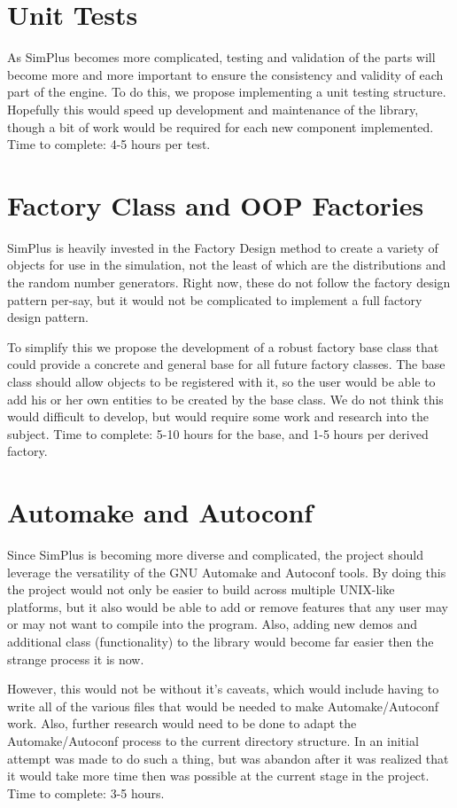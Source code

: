 \documentclass[12pt]{report}
\begin{document}
\section{Unit Tests}
	As SimPlus becomes more complicated, testing and validation of the parts will become more and more important to ensure the consistency and validity of each part of the engine.  To do this, we propose implementing a unit testing structure.  Hopefully this would speed up development and maintenance of the library, though a bit of work would be required for each new component implemented.  Time to complete: 4-5 hours per test.

\section{Factory Class and OOP Factories}
	SimPlus is heavily invested in the Factory Design method to create a variety of objects for use in the simulation, not the least of which are the distributions and the random number generators.  Right now, these do not follow the factory design pattern per-say, but it would not be complicated to implement a full factory design pattern.

	To simplify this we propose the development of a robust factory base class that could provide a concrete and general base for all future factory classes.  The base class should allow objects to be registered with it, so the user would be able to add his or her own entities to be created by the base class.  We do not think this would difficult to develop, but would require some work and research into the subject.  Time to complete: 5-10 hours for the base, and 1-5 hours per derived factory.

\section{Automake and Autoconf}
	Since SimPlus is becoming more diverse and complicated, the project should leverage the versatility of the GNU Automake and Autoconf tools.  By doing this the project would not only be easier to build across multiple UNIX-like platforms, but it also would be able to add or remove features that any user may or may not want to compile into the program.  Also, adding new demos and additional class (functionality) to the library would become far easier then the strange process it is now.

	However, this would not be without it's caveats, which would include having to write all of the various files that would be needed to make Automake/Autoconf work.  Also, further research would need to be done to adapt the Automake/Autoconf process to the current directory structure.  In an initial attempt was made to do such a thing, but was abandon after it was realized that it would take more time then was possible at the current stage in the project. Time to complete: 3-5 hours.
\end{document}
